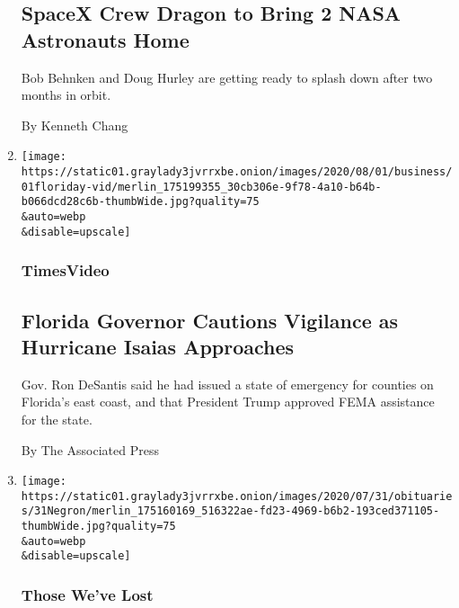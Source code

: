\begin{enumerate}
  \hypertarget{spacex-crew-dragon-to-bring-2-nasa-astronauts-home}{%
  \subsection{SpaceX Crew Dragon to Bring 2 NASA Astronauts
  Home}\label{spacex-crew-dragon-to-bring-2-nasa-astronauts-home}}

  Bob Behnken and Doug Hurley are getting ready to splash down after two
  months in orbit.

  By Kenneth Chang
\item
  \href{/video/us/100000007268424/desantis-florida-hurricane-isaias.html}{}

  \texttt{[image: https://static01.graylady3jvrrxbe.onion/images/2020/08/01/business/01floriday-vid/merlin\_175199355\_30cb306e-9f78-4a10-b64b-b066dcd28c6b-thumbWide.jpg?quality=75\\\&auto=webp\\\&disable=upscale]}

  \hypertarget{timesvideo}{%
  \subsubsection{TimesVideo}\label{timesvideo}}

  \hypertarget{florida-governor-cautions-vigilance-as-hurricane-isaias-approaches}{%
  \subsection{Florida Governor Cautions Vigilance as Hurricane Isaias
  Approaches}\label{florida-governor-cautions-vigilance-as-hurricane-isaias-approaches}}

  Gov. Ron DeSantis said he had issued a state of emergency for counties
  on Florida's east coast, and that President Trump approved FEMA
  assistance for the state.

  By The Associated Press
\item
  \href{/2020/08/01/obituaries/eddie-negron-dead-coronavirus.html}{}

  \texttt{[image: https://static01.graylady3jvrrxbe.onion/images/2020/07/31/obituaries/31Negron/merlin\_175160169\_516322ae-fd23-4969-b6b2-193ced371105-thumbWide.jpg?quality=75\\\&auto=webp\\\&disable=upscale]}

  \hypertarget{those-weve-lost}{%
  \subsubsection{Those We've Lost}\label{those-weve-lost}}


\end{enumerate}
